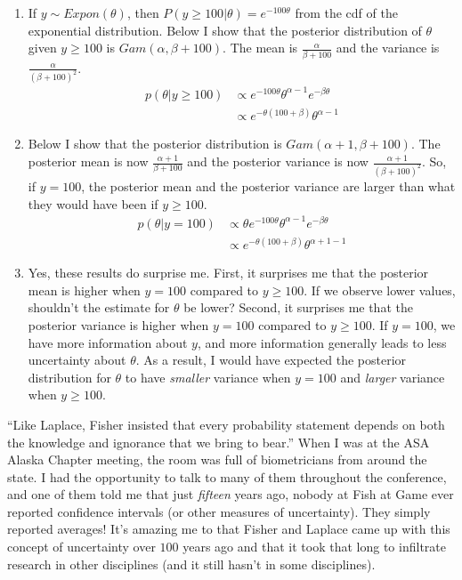 \documentclass[12pt]{article}\usepackage[]{graphicx}\usepackage[]{color}
\begin{document}
\begin{doublespacing}

\begin{enumerate}
\item If $y \sim Expon(\theta)$, then $P(y \geq 100|\theta) = e^{-100\theta}$ from the cdf of the exponential distribution. Below I show that the posterior distribution of $\theta$ given $y \geq 100$ is $Gam(\alpha, \beta+100)$. The mean is $\frac{\alpha}{\beta+100}$ and the variance is $\frac{\alpha}{(\beta+100)^2}$.
\begin{align*}
p(\theta|y\geq 100) &\propto e^{-100\theta} \theta^{\alpha-1} e^{-\beta \theta} \\
&\propto e^{-\theta(100+\beta)}\theta^{\alpha-1}
\end{align*}

\item Below I show that the posterior distribution is $Gam(\alpha+1, \beta+100)$. The posterior mean is now $\frac{\alpha+1}{\beta+100}$ and the posterior variance is now $\frac{\alpha+1}{(\beta+100)^2}$. So, if $y=100$, the posterior mean and the posterior variance are larger than what they would have been if $y \geq 100$.
\begin{align*}
p(\theta|y=100) &\propto \theta e^{-100\theta} \theta^{\alpha-1} e^{-\beta \theta} \\
&\propto e^{-\theta(100+\beta)}\theta^{\alpha+1-1}
\end{align*}

\item Yes, these results do surprise me. First, it surprises me that the posterior mean is higher when $y=100$ compared to $y \geq 100$. If we observe lower values, shouldn't the estimate for $\theta$ be lower? Second, it surprises me that the posterior variance is higher when $y=100$ compared to $y \geq 100$. If $y=100$, we have more information about $y$, and more information generally leads to less uncertainty about $\theta$. As a result, I would have expected the posterior distribution for $\theta$ to have {\it smaller} variance when $y=100$ and {\it larger} variance when $y \geq 100$. 

\end{enumerate}


\noindent ``Like Laplace, Fisher insisted that every probability statement depends
on both the knowledge and ignorance that we bring to bear.'' When I was at the ASA Alaska Chapter meeting, the room was full of biometricians from around the state. I had the opportunity to talk to many of them throughout the conference, and one of them told me that just {\it fifteen} years ago, nobody at Fish at Game ever reported confidence intervals (or other measures of uncertainty). They simply reported averages! It's amazing me to that Fisher and Laplace came up with this concept of uncertainty over $100$ years ago and that it took that long to infiltrate research in other disciplines (and it still hasn't in some disciplines). \\


\end{doublespacing}
\end{document}
